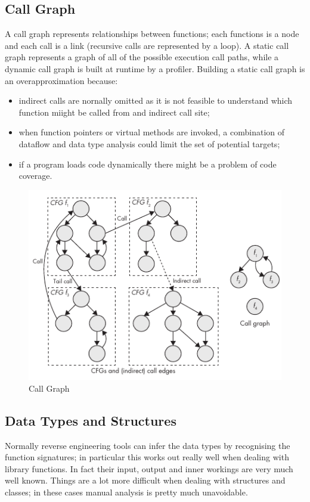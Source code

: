 \subsection{Call Graph}
A call graph represents relationships between functions; each functions is a node and each call is a link (recursive
calls are represented by a loop). A static call graph represents a graph of all of the possible execution call paths,
while a dynamic call graph is built at runtime by a profiler. Building a static call graph is an overapproximation
because:
\begin{itemize}
    \item indirect calls are nornally omitted as it is not feasible to understand which function miight be called from
        and indirect call site;
    \item when function pointers or virtual methods are invoked, a combination of dataflow and data type analysis could
        limit the set of potential targets;
    \item if a program loads code dynamically there might be a problem of code coverage.
\end{itemize}

\begin{figure}
    \begin{center}
        \includegraphics{./pics/call_graph.png}
        \caption{Call Graph}
        \label{call_graph}
    \end{center}
\end{figure}


\subsection{Data Types and Structures}
Normally reverse engineering tools can infer the data types by recognising the function signatures; in particular this
works out really well when dealing with library functions. In fact their input, output and inner workings are very much
well known. Things are a lot more difficult when dealing with structures and classes; in these cases manual analysis is
pretty much unavoidable.


